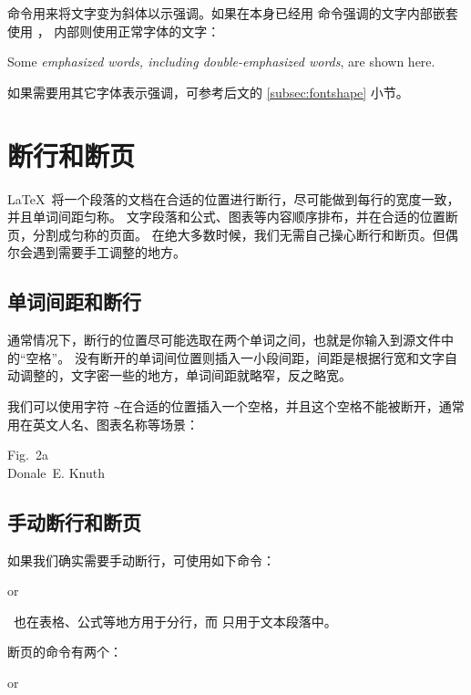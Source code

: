 {
 命令用来将文字变为斜体以示强调。如果在本身已经用  命令强调的文字内部嵌套使用 ，
内部则使用正常字体的文字：
\begin{example}
Some \emph{emphasized words, 
including \emph{double-emphasized}
words}, are shown here.
\end{example}

如果需要用其它字体表示强调，可参考后文的 \ref{subsec:fontshape} 小节。

\section{断行和断页}\label{sec:break}

\LaTeX\ 将一个段落的文档在合适的位置进行断行，尽可能做到每行的宽度一致，并且单词间距匀称。
文字段落和公式、图表等内容顺序排布，并在合适的位置断页，分割成匀称的页面。
在绝大多数时候，我们无需自己操心断行和断页。但偶尔会遇到需要手工调整的地方。

\subsection{单词间距和断行}\label{subsec:interword}

通常情况下，断行的位置尽可能选取在两个单词之间，也就是你输入到源文件中的“空格”。
没有断开的单词间位置则插入一小段间距，间距是根据行宽和文字自动调整的，文字密一些的地方，单词间距就略窄，反之略宽。

我们可以使用字符 \texttt\textasciitilde 在合适的位置插入一个空格，并且这个空格不能被断开，通常用在英文人名、图表名称等场景：
\begin{example}
Fig.~2a \\
Donale~E. Knuth
\end{example}

\subsection{手动断行和断页}\label{subsec:manual-break}

 
如果我们确实需要手动断行，可使用如下命令：
\begin{command}
\crcmd \quad or \quad {}
\end{command}

\crcmd\ 也在表格、公式等地方用于分行，而  只用于文本段落中。

断页的命令有两个：
\begin{command}
  \quad  or \quad {}
\end{command}

}
